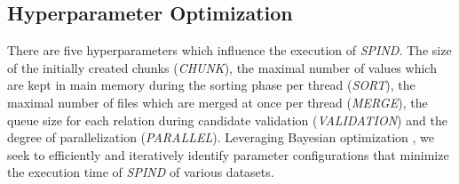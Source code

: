 \subsection{Hyperparameter Optimization}
There are five hyperparameters which influence the execution of \textit{SPIND}. The size of the initially created chunks (\textit{CHUNK}), the maximal number of values which are kept in main memory during the sorting phase per thread (\textit{SORT}), the maximal number of files which are merged at once per thread (\textit{MERGE}), the queue size for each relation during candidate validation (\textit{VALIDATION}) and the degree of parallelization (\textit{PARALLEL}). Leveraging Bayesian optimization \cite{shahriari2015taking}, we seek to efficiently and iteratively identify parameter configurations that minimize the execution time of \textit{SPIND} of various datasets.